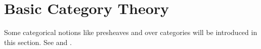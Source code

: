\section{Basic Category Theory}
Some categorical notions like presheaves and over categories will be introduced in this section.
See \cite{awodayCat} and \cite{sheavGeomLogic}. 






